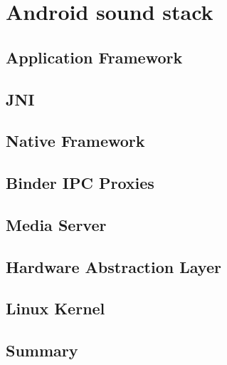 \section{Android sound stack}

\subsection{Application Framework}
\subsection{JNI}
\subsection{Native Framework}
\subsection{Binder IPC Proxies}
\subsection{Media Server}
\subsection{Hardware Abstraction Layer}
\subsection{Linux Kernel}
\subsection{Summary}



